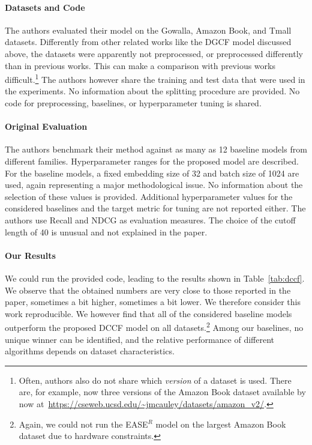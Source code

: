 \documentclass[sigconf,natbib=true,nonacm]{acmart}
\newcommand{\easer}{EASE$^R$\xspace}
\begin{document}
\paragraph{Datasets and Code} The authors evaluated their model on the Gowalla, Amazon Book, and Tmall datasets. Differently from other related works like the DGCF model discussed above, the datasets were apparently not preprocessed, or preprocessed differently than in previous works. This can make a comparison with previous works difficult.\footnote{Often, authors also do not share which \emph{version} of a dataset is used. There are, for example, now three versions of the Amazon Book dataset available by now at~\url{https://cseweb.ucsd.edu/~jmcauley/datasets/amazon_v2/}.} The authors however share the training and test data that were used in the experiments. No information about the splitting procedure are provided. No code for preprocessing, baselines, or hyperparameter tuning is shared.

\paragraph{Original Evaluation} The authors benchmark their method against as many as 12 baseline models from different families. Hyperparameter ranges for the proposed model are described. For the baseline models, a fixed embedding size of 32 and batch size of 1024 are used, again representing a major methodological issue. No information about the selection of these values is provided. Additional hyperparameter values for the considered baselines and the target metric for tuning are not reported either. The authors use Recall and NDCG as evaluation measures. The choice of the cutoff length of 40 is unusual and not explained in the paper.


\paragraph{Our Results} We could run the provided code, leading to the results shown in Table~\ref{tab:dccf}. We observe that the obtained numbers are very close to those reported in the paper, sometimes a bit higher, sometimes a bit lower. We therefore consider this work reproducible. We however find that all of the considered baseline models outperform the proposed DCCF model on all datasets.\footnote{Again, we could not run the \easer model on the largest Amazon Book dataset due to hardware constraints.} Among our baselines, no unique winner can be identified, and the relative performance of different algorithms depends on dataset characteristics.
\end{document}
